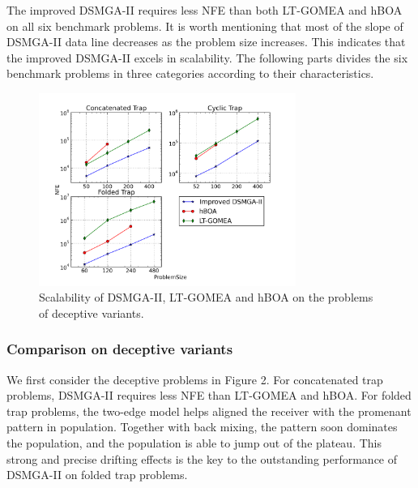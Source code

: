 \documentclass{sig-alternate-05-2015}
\begin{document}
The improved DSMGA-II requires less NFE than both LT-GOMEA and hBOA on all six benchmark problems.
It is worth mentioning that most of the slope of DSMGA-II data line decreases as the problem size increases.
This indicates that the improved DSMGA-II excels in scalability.
The following parts divides the six benchmark problems in three categories according to their characteristics. 


\begin{figure}
\centering
\includegraphics[width=3.3in]{trapResults}
\caption{Scalability of DSMGA-II, LT-GOMEA and hBOA on the problems of deceptive variants.}
\end{figure}

\subsubsection{ Comparison on deceptive variants }


We first consider the deceptive problems in Figure 2.
For concatenated trap problems, DSMGA-II requires less NFE than LT-GOMEA and hBOA.
For folded trap problems, the two-edge model helps aligned the receiver with the promenant pattern in population.
Together with back mixing, the pattern soon dominates the population, and the population is able to jump out of the plateau. 
This strong and precise drifting effects is the key to the outstanding performance of DSMGA-II on folded trap problems.
\end{document}
